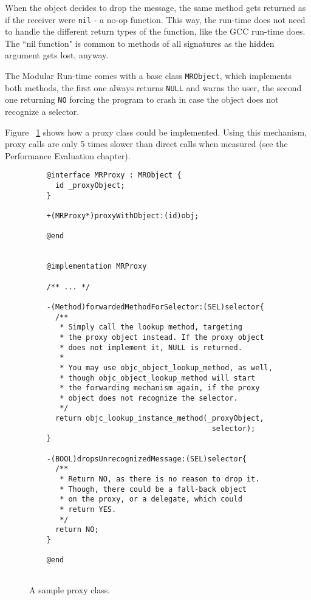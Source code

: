 When the object decides to drop the message, the same method gets returned as if the receiver were \verb=nil= - a no-op function. This way, the run-time does not need to handle the different return types of the function, like the GCC run-time does. The ``nil function" is common to methods of all signatures as the hidden argument gets lost, anyway.

The Modular Run-time comes with a base class \verb=MRObject=, which implements both methods, the first one always returns \verb=NULL= and warns the user, the second one returning \verb=NO= forcing the program to crash in case the object does not recognize a selector.

Figure ~\ref{fig:forwarding_proxy_class} shows how a proxy class could be implemented. Using this mechanism, proxy calls are only 5 times slower than direct calls when measured (see the Performance Evaluation chapter).

\begin{figure}[H] 
  \begin{verbatim}
    @interface MRProxy : MRObject {
      id _proxyObject;
    }
    
    +(MRProxy*)proxyWithObject:(id)obj;
    
    @end
    
    
    @implementation MRProxy
    
    /** ... */
    
    -(Method)forwardedMethodForSelector:(SEL)selector{
      /** 
       * Simply call the lookup method, targeting
       * the proxy object instead. If the proxy object
       * does not implement it, NULL is returned.
       *
       * You may use objc_object_lookup_method, as well,
       * though objc_object_lookup_method will start
       * the forwarding mechanism again, if the proxy
       * object does not recognize the selector.
       */
      return objc_lookup_instance_method(_proxyObject, 
                                          selector);
    }
    
    -(BOOL)dropsUnrecognizedMessage:(SEL)selector{
      /** 
       * Return NO, as there is no reason to drop it.
       * Though, there could be a fall-back object 
       * on the proxy, or a delegate, which could 
       * return YES.
       */
      return NO;
    }
    
    @end
    
  \end{verbatim}
  \centering{}
  \caption{A sample proxy class.}
  \label{fig:forwarding_proxy_class}
\end{figure}


